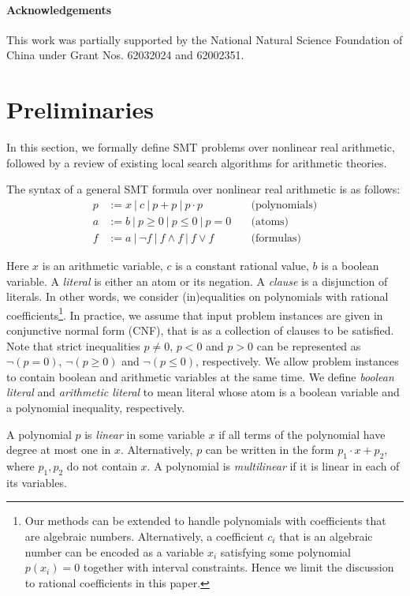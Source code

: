 \documentclass[runningheads]{llncs}
\begin{document}
\paragraph{Acknowledgements} This work was partially supported by the National Natural Science Foundation of China under Grant Nos. 62032024 and 62002351.

\section{Preliminaries}
\label{sec:preliminaries}

In this section, we formally define SMT problems over nonlinear real arithmetic, followed by a review of existing local search algorithms for arithmetic theories.

The syntax of a general SMT formula over nonlinear real arithmetic is as follows:
\begin{align*}
    p &:= x ~|~ c ~|~ p + p ~|~ p \cdot p &\quad\mbox{(polynomials)} \\
    a &:= b ~|~ p \ge 0 ~|~ p \le 0 ~|~ p = 0 &\quad\mbox{(atoms)} \\
    f &:= a ~|~ \neg f ~|~ f \wedge f ~|~ f \vee f &\quad\mbox{(formulas)}
\end{align*}

Here $x$ is an arithmetic variable, $c$ is a constant rational value, $b$ is a boolean variable. A \emph{literal} is either an atom or its negation. A \emph{clause} is a disjunction of literals. In other words, we consider (in)equalities on polynomials with rational coefficients\footnote{Our methods can be extended to handle polynomials with coefficients that are algebraic numbers. Alternatively, a coefficient $c_i$ that is an algebraic number can be encoded as a variable $x_i$ satisfying some polynomial $p(x_i)=0$ together with interval constraints. Hence we limit the discussion to rational coefficients in this paper.}. In practice, we assume that input problem instances are given in conjunctive normal form (CNF), that is as a collection of clauses to be satisfied. Note that strict inequalities $p\neq 0$, $p<0$ and $p>0$ can be represented as $\neg (p=0)$, $\neg (p\ge 0)$ and $\neg (p\le 0)$, respectively. We allow problem instances to contain boolean and arithmetic variables at the same time. We define \emph{boolean literal} and \emph{arithmetic literal} to mean literal whose atom is a boolean variable and a polynomial inequality, respectively.

A polynomial $p$ is \emph{linear} in some variable $x$ if all terms of the polynomial have degree at most one in $x$. Alternatively, $p$ can be written in the form $p_1\cdot x + p_2$, where $p_1,p_2$ do not contain $x$. A polynomial is \emph{multilinear} if it is linear in each of its variables.
\end{document}
